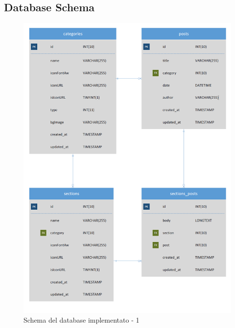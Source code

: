 \documentclass[twoside]{supsistudent}
\begin{document}
\subsection{Database Schema}
\begin{figure}[!h]
\centering
\includegraphics[scale=0.6]{schema_1.PNG}
\caption{Schema del database implementato - 1}
\end{figure}
\end{document}
